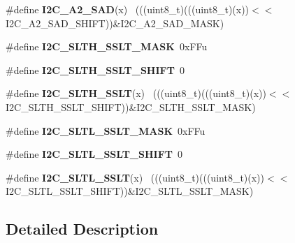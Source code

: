\begin{DoxyCompactItemize}
\item 
\hypertarget{group___i2_c___register___masks_gad2d2b455e73424296d197bfae13a2c3b}{}\#define {\bfseries I2\+C\+\_\+\+A2\+\_\+\+S\+A\+D}(x)                                                    ~(((uint8\+\_\+t)(((uint8\+\_\+t)(x))$<$$<$I2\+C\+\_\+\+A2\+\_\+\+S\+A\+D\+\_\+\+S\+H\+I\+F\+T))\&I2\+C\+\_\+\+A2\+\_\+\+S\+A\+D\+\_\+\+M\+A\+S\+K)\label{group___i2_c___register___masks_gad2d2b455e73424296d197bfae13a2c3b}

\item 
\hypertarget{group___i2_c___register___masks_gaeef081c4825bc9248b218f4c6ee70f86}{}\#define {\bfseries I2\+C\+\_\+\+S\+L\+T\+H\+\_\+\+S\+S\+L\+T\+\_\+\+M\+A\+S\+K}~0x\+F\+Fu\label{group___i2_c___register___masks_gaeef081c4825bc9248b218f4c6ee70f86}

\item 
\hypertarget{group___i2_c___register___masks_gadc7429d429b6c58a18bcf147884e618f}{}\#define {\bfseries I2\+C\+\_\+\+S\+L\+T\+H\+\_\+\+S\+S\+L\+T\+\_\+\+S\+H\+I\+F\+T}~0\label{group___i2_c___register___masks_gadc7429d429b6c58a18bcf147884e618f}

\item 
\hypertarget{group___i2_c___register___masks_ga44bb9ace4180c86c1db2c2309a3af91a}{}\#define {\bfseries I2\+C\+\_\+\+S\+L\+T\+H\+\_\+\+S\+S\+L\+T}(x)                                              ~(((uint8\+\_\+t)(((uint8\+\_\+t)(x))$<$$<$I2\+C\+\_\+\+S\+L\+T\+H\+\_\+\+S\+S\+L\+T\+\_\+\+S\+H\+I\+F\+T))\&I2\+C\+\_\+\+S\+L\+T\+H\+\_\+\+S\+S\+L\+T\+\_\+\+M\+A\+S\+K)\label{group___i2_c___register___masks_ga44bb9ace4180c86c1db2c2309a3af91a}

\item 
\hypertarget{group___i2_c___register___masks_gac29118698aa1c246c26835a19210a0c9}{}\#define {\bfseries I2\+C\+\_\+\+S\+L\+T\+L\+\_\+\+S\+S\+L\+T\+\_\+\+M\+A\+S\+K}~0x\+F\+Fu\label{group___i2_c___register___masks_gac29118698aa1c246c26835a19210a0c9}

\item 
\hypertarget{group___i2_c___register___masks_ga177f38e09f29a382b35b19906462204f}{}\#define {\bfseries I2\+C\+\_\+\+S\+L\+T\+L\+\_\+\+S\+S\+L\+T\+\_\+\+S\+H\+I\+F\+T}~0\label{group___i2_c___register___masks_ga177f38e09f29a382b35b19906462204f}

\item 
\hypertarget{group___i2_c___register___masks_ga5aa875b218a0943f94bc4993eee62489}{}\#define {\bfseries I2\+C\+\_\+\+S\+L\+T\+L\+\_\+\+S\+S\+L\+T}(x)                                              ~(((uint8\+\_\+t)(((uint8\+\_\+t)(x))$<$$<$I2\+C\+\_\+\+S\+L\+T\+L\+\_\+\+S\+S\+L\+T\+\_\+\+S\+H\+I\+F\+T))\&I2\+C\+\_\+\+S\+L\+T\+L\+\_\+\+S\+S\+L\+T\+\_\+\+M\+A\+S\+K)\label{group___i2_c___register___masks_ga5aa875b218a0943f94bc4993eee62489}

\end{DoxyCompactItemize}


\subsection{Detailed Description}
